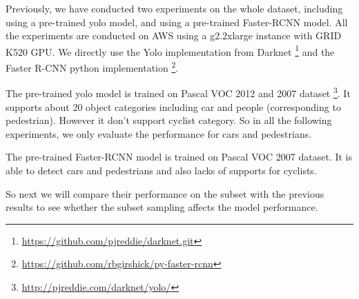 Previously, we have conducted two experiments on the whole dataset,
including using a pre-trained yolo model,
and using a pre-trained Faster-RCNN model. All the experiments are conducted on AWS using a g2.2xlarge instance with GRID K520 GPU. We directly use the Yolo implementation from Darknet \footnote{\url{https://github.com/pjreddie/darknet.git}} and the Faster R-CNN python implementation \footnote{\url{https://github.com/rbgirshick/py-faster-rcnn}}.

The pre-trained yolo model is trained on Pascal VOC 2012 and 2007 dataset \footnote{\url{http://pjreddie.com/darknet/yolo/}}. It supports about 20 object categories including car and people (corresponding to pedestrian). However it don't support cyclist category. So in all the following experiments, we only evaluate the performance for cars and pedestrians.

The pre-trained Faster-RCNN model is trained on Pascal VOC 2007 dataset. It is able to detect cars and pedestrians and also lacks of supports for cyclists.

So next we will compare their performance on the subset with the 
previous results to see whether the subset sampling affects the 
model performance.


